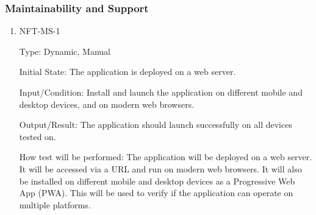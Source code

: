 \documentclass[12pt, titlepage]{article}
\begin{document}
\subsubsection{Maintainability and Support}
\begin{enumerate}
\item{NFT-MS-1}

Type: Dynamic, Manual
					
Initial State: The application is deployed on a web server.
					
Input/Condition: Install and launch the application on different mobile and desktop devices, and on modern web browsers.
					
Output/Result: The application should launch successfully on all devices tested on.
					
How test will be performed: The application will be deployed on a web server. It will be accessed via a URL and run on modern web browsers. It will also be installed on different mobile and desktop devices as a Progressive Web App (PWA). This will be used to verify if the application can operate on multiple platforms.
\end{enumerate}
\end{document}
